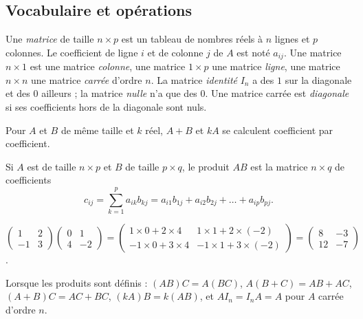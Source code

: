 \subsection{Vocabulaire et opérations}
\begin{definition}[Matrice]
Une \emph{matrice} de taille $n\times p$ est un tableau de nombres réels à $n$ lignes et $p$ colonnes. Le coefficient de ligne $i$ et de colonne $j$ de $A$ est noté $a_{ij}$. Une matrice $n\times1$ est une matrice \emph{colonne}, une matrice $1\times p$ une matrice \emph{ligne}, une matrice $n\times n$ une matrice \emph{carrée} d'ordre $n$. La matrice \emph{identité} $I_n$ a des $1$ sur la diagonale et des $0$ ailleurs ; la matrice \emph{nulle} n'a que des $0$. Une matrice carrée est \emph{diagonale} si ses coefficients hors de la diagonale sont nuls.
\end{definition}
\begin{definition}
Pour $A$ et $B$ de même taille et $k$ réel, $A+B$ et $kA$ se calculent coefficient par coefficient.\par
Si $A$ est de taille $n\times p$ et $B$ de taille $p\times q$, le produit $AB$ est la matrice $n\times q$ de coefficients
\[c_{ij}=\sum_{k=1}^{p}a_{ik}b_{kj}=a_{i1}b_{1j}+a_{i2}b_{2j}+\dots+a_{ip}b_{pj}.\]
\end{definition}
\begin{example}[Un produit]
$\begin{pmatrix}1&2\\-1&3\end{pmatrix}\begin{pmatrix}0&1\\4&-2\end{pmatrix}=\begin{pmatrix}1\times0+2\times4&1\times1+2\times(-2)\\-1\times0+3\times4&-1\times1+3\times(-2)\end{pmatrix}=\begin{pmatrix}8&-3\\12&-7\end{pmatrix}$.
\end{example}
\begin{theorem}
Lorsque les produits sont définis : $(AB)C=A(BC)$, $A(B+C)=AB+AC$, $(A+B)C=AC+BC$, $(kA)B=k(AB)$, et $AI_n=I_nA=A$ pour $A$ carrée d'ordre $n$.
\end{theorem}
